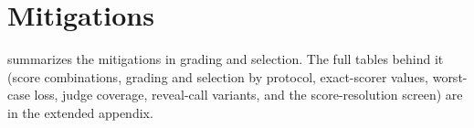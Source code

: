 \begin{table}[htbp]
\centering
\caption{Hard single-answer questions: share of label-wrong answers credited (95\% CI, question bootstrap) and label-correct answers credited, by grader and condition.\pre}
\label{tab:r27b}
\footnotesize

\end{table}

\FloatBarrier
\section{Mitigations}
\label{app:mitigation}

 summarizes the mitigations in grading and selection. The full tables behind it (score combinations, grading and selection by protocol, exact-scorer values, worst-case loss, judge coverage, reveal-call variants, and the score-resolution screen) are in the extended appendix.

